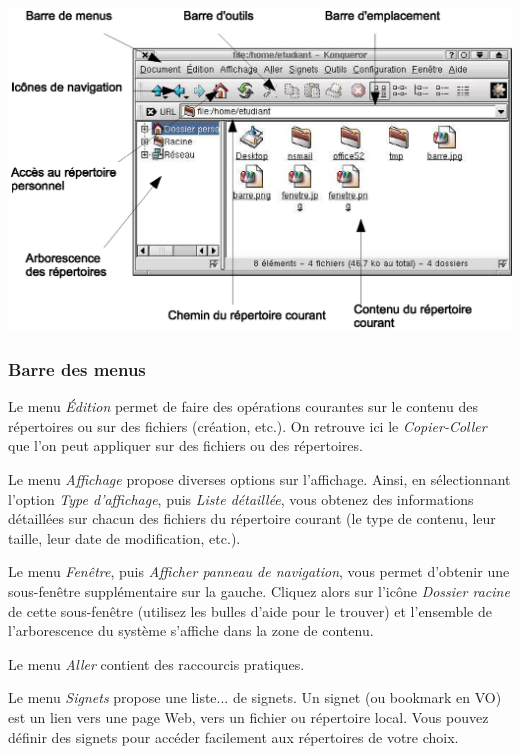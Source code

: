 \documentclass[12pt,a4paper]{article}
\begin{document}
\begin{center}
  \includegraphics{img/konqueror.eps}
\end{center}


\subsubsection{Barre des menus}

Le menu \emph{Édition} permet de faire des opérations courantes sur le
contenu des répertoires ou sur des fichiers (création, etc.). On
retrouve ici le \emph{Copier-Coller} que l'on peut appliquer sur des fichiers
ou des répertoires. 

Le menu \emph{Affichage} propose diverses options sur
l'affichage. Ainsi, en sélectionnant l'option \emph{Type d'affichage},
puis \emph{Liste détaillée}, vous obtenez des informations détaillées
sur chacun des fichiers du répertoire courant (le type de contenu,
leur taille, leur date de modification, etc.).

Le menu \emph{Fenêtre}, puis \emph{Afficher panneau de navigation},
vous permet d'obtenir une sous-fenêtre supplémentaire sur la
gauche. Cliquez alors sur l'icône \emph{Dossier racine} de cette
sous-fenêtre (utilisez les bulles d'aide pour le trouver) et
l'ensemble de l'arborescence du système s'affiche dans la zone de
contenu.

Le menu \emph{Aller} contient des raccourcis pratiques.

Le menu \emph{Signets} propose une liste... de signets. Un signet (ou
bookmark en VO) est un lien vers une page Web, vers un fichier ou
répertoire local. Vous pouvez définir des signets pour accéder 
facilement aux répertoires de votre choix.
\end{document}
